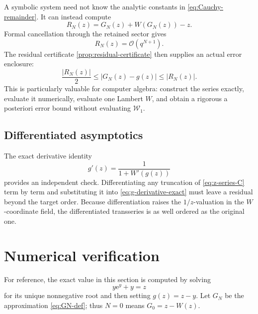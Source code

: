 \documentclass[11pt,a4paper]{article}
\numberwithin{equation}{section}
\theoremstyle{definition}
\theoremstyle{remark}
\newcommand{\e}{\mathrm e}
\newcommand{\Ord}{\mathcal O}
\newcommand{\rW}{\mathcal W}
\begin{document}
A symbolic system need not know the analytic constants in
\eqref{eq:Cauchy-remainder}.  It can instead compute
\begin{equation}\label{eq:RN-def}
  R_N(z)=G_N(z)+W(G_N(z))-z.
\end{equation}
Formal cancellation through the retained sector gives
\[
  R_N(z)=\Ord(q^{N+1}).
\]
The residual certificate \cref{prop:residual-certificate} then supplies
an actual error enclosure:
\begin{equation}\label{eq:residual-error-GN}
  \frac{|R_N(z)|}{2}\le |G_N(z)-g(z)|\le |R_N(z)|.
\end{equation}
This is particularly valuable for computer algebra: construct the series
exactly, evaluate it numerically, evaluate one Lambert \(W\), and obtain a
rigorous a posteriori error bound without evaluating \(\rW_1\).

\subsection{Differentiated asymptotics}

The exact derivative identity
\begin{equation}\label{eq:g-derivative-exact}
  g'(z)=\frac1{1+W'(g(z))}
\end{equation}
provides an independent check.  Differentiating any truncation of
\eqref{eq:z-series-C} term by term and substituting it into
\eqref{eq:g-derivative-exact} must leave a residual beyond the target
order.  Because differentiation raises the \(1/z\)-valuation in the
\(W\)-coordinate field, the differentiated transseries is as well ordered
as the original one.

\section{Numerical verification}

For reference, the exact value in this section is computed by solving
\begin{equation}\label{eq:numeric-rW-equation}
  y\e^y+y=z
\end{equation}
for its unique nonnegative root and then setting \(g(z)=z-y\).  Let
\(G_N\) be the approximation \eqref{eq:GN-def}; thus \(N=0\) means
\(G_0=z-W(z)\).
\end{document}
